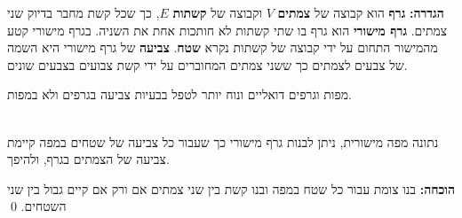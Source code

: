 \begin{center}
\end{center}

\textbf{הגדרה:}
\textbf{גרף}
הוא קבוצה של 
\textbf{צמתים}
$V$
וקבוצה של 
\textbf{קשתות}
$E$,
כך שכל קשת מחבר בדיוק שני צמתים.
\textbf{גרף מישורי}
הוא גרף בו שתי קשתות לא חותכות אחת את השניה. בגרף מישורי קטע מהמישור התחום על ידי קבוצה של קשתות נקרא 
\textbf{שטח}.
\textbf{צביעה}
של גרף מישורי היא השמה של צבעים לצמתים כך ששני צמתים המחוברים על ידי קשת צבועים בצבעים שונים.


מפות וגרפים דואליים ונוח יותר לטפל בבעיות צביעה בגרפים ולא במפות.
\begin{theorem}\mbox{}\\
נתונה מפה מישורית, ניתן לבנות גרף מישורי כך שעבור כל צביעה של שטחים במפה קיימת צביעה של הצמתים בגרף, ולהיפך.
\end{theorem}

\textbf{הוכחה:}
בנו צומת עבור כל שטח במפה ובנו קשת בין שני צמתים אם ורק אם קיים גבול בין שני השטחים.
\qed

